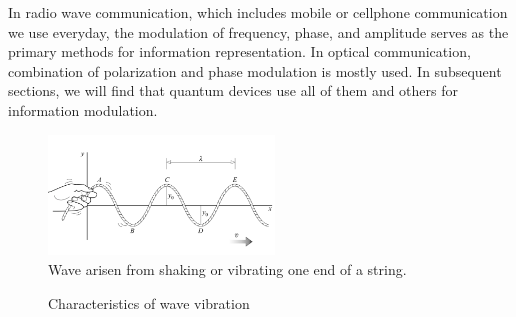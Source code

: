 \documentclass{book}
\begin{document}
In radio wave communication, which includes mobile or cellphone communication we use everyday, the modulation of frequency, phase, and amplitude serves as the primary methods for information representation. In optical communication, combination of polarization and phase modulation is mostly used. In subsequent sections, we will find that quantum devices use all of them and others for information modulation.

\begin{figure}[ht]
\includegraphics[width=6cm]{pic/wave-in-a-string.png}
\caption{Wave arisen from shaking or vibrating one end of a string.}
\label{String}
\end{figure}

\begin{figure}[ht]
\caption{Characteristics of wave vibration}
\label{wave}
\end{figure}
\end{document}
